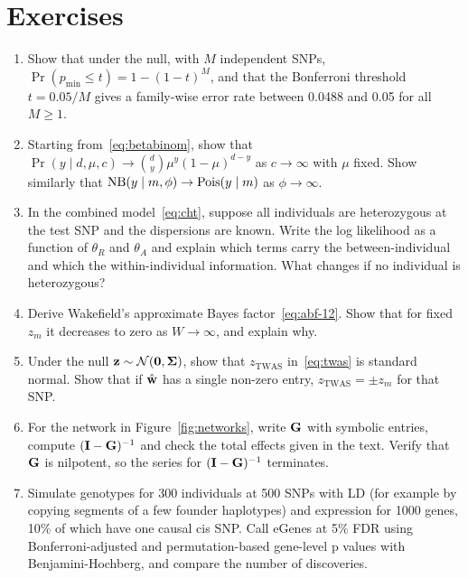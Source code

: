 \section*{Exercises}

\begin{enumerate}
  \item Show that under the null, with $M$ independent SNPs, $\Pr(p_{\min}\leq t)=1-(1-t)^M$, and that the Bonferroni threshold $t=0.05/M$ gives a family-wise error rate between 0.0488 and 0.05 for all $M\geq1$.
  \item Starting from~\eqref{eq:betabinom}, show that $\Pr(y\mid d,\mu,c)\to\binom{d}{y}\mu^y(1-\mu)^{d-y}$ as $c\to\infty$ with $\mu$ fixed. Show similarly that $\operatorname{NB}(y\mid m,\phi)\to\operatorname{Pois}(y\mid m)$ as $\phi\to\infty$.
  \item In the combined model~\eqref{eq:cht}, suppose all individuals are heterozygous at the test SNP and the dispersions are known. Write the log likelihood as a function of $\theta_R$ and $\theta_A$ and explain which terms carry the between-individual and which the within-individual information. What changes if no individual is heterozygous?
  \item Derive Wakefield's approximate Bayes factor~\eqref{eq:abf-12}. Show that for fixed $z_m$ it decreases to zero as $W\to\infty$, and explain why.
  \item Under the null $\mathbf{z}\sim\mathcal{N}(\mathbf{0},\boldsymbol{\Sigma})$, show that $z_{\text{TWAS}}$ in~\eqref{eq:twas} is standard normal. Show that if $\hat{\mathbf{w}}$ has a single non-zero entry, $z_{\text{TWAS}}=\pm z_m$ for that SNP.
  \item For the network in Figure~\ref{fig:networks}, write $\mathbf{G}$ with symbolic entries, compute $(\mathbf{I}-\mathbf{G})^{-1}$ and check the total effects given in the text. Verify that $\mathbf{G}$ is nilpotent, so the series for $(\mathbf{I}-\mathbf{G})^{-1}$ terminates.
  \item Simulate genotypes for 300 individuals at 500 SNPs with LD (for example by copying segments of a few founder haplotypes) and expression for 1000 genes, 10\% of which have one causal cis SNP. Call eGenes at 5\% FDR using Bonferroni-adjusted and permutation-based gene-level p values with Benjamini-Hochberg, and compare the number of discoveries.
\end{enumerate}

